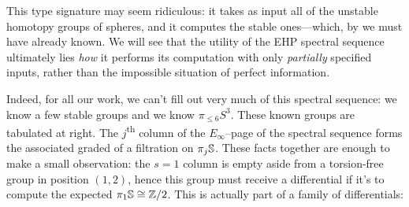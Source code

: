 This type signature may seem ridiculous: it takes as input all of the unstable homotopy groups of spheres, and it computes the stable ones---which, by  we must have already known.
We will see that the utility of the EHP spectral sequence ultimately lies \emph{how} it performs its computation with only \emph{partially} specified inputs, rather than the impossible situation of perfect information.

Indeed, for all our work, we can't fill out very much of this spectral sequence: we know a few stable groups and we know $\pi_{\le 6} S^3$.
These known groups are tabulated at right.
The $j$\textsuperscript{th} column of the $E_\infty$--page of the spectral sequence forms the associated graded of a filtration on $\pi_j \S$.
These facts together are enough to make a small observation: the $s = 1$ column is empty aside from a torsion-free group in position $(1, 2)$, hence this group must receive a differential if it's to compute the expected $\pi_1 \S \cong \Z/2$.
This is actually part of a family of differentials:

